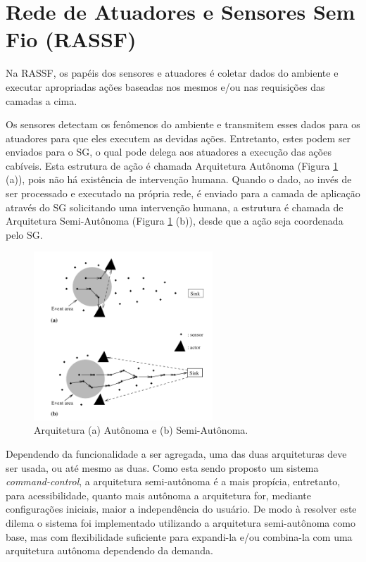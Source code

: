 \documentclass[12pt,a4paper,oneside]{report}
\begin{document}
\section{Rede de Atuadores e Sensores Sem Fio (RASSF)}

Na RASSF, os papéis dos sensores e atuadores é coletar dados do ambiente e executar apropriadas ações baseadas nos mesmos e/ou nas requisições das camadas a cima.

Os sensores detectam os fenômenos do ambiente e transmitem esses dados para os atuadores para que eles executem as devidas ações. Entretanto, estes podem ser enviados para o SG, o qual pode delega aos atuadores a execução das ações cabíveis. Esta estrutura de ação é chamada Arquitetura Autônoma (Figura \ref{fig:arquitetura-autonoma} (a)), pois não há existência de intervenção humana. Quando o dado, ao invés de ser processado e executado na própria rede, é enviado para a camada de aplicação através do SG solicitando uma intervenção humana, a estrutura é chamada de Arquitetura Semi-Autônoma (Figura \ref{fig:arquitetura-autonoma} (b)), desde que a ação seja coordenada pelo SG.

\begin{figure}[htbp]
   \centering
    \includegraphics[width=0.6\textwidth]{figuras/figura_2_6}
    \caption{Arquitetura (a) Autônoma e (b) Semi-Autônoma.}
    \label{fig:arquitetura-autonoma}
\end{figure}

Dependendo da funcionalidade a ser agregada, uma das duas arquiteturas deve ser usada, ou até mesmo as duas. Como esta sendo proposto um sistema \emph{command-control}, a arquitetura semi-autônoma é a mais propícia, entretanto, para acessibilidade, quanto mais autônoma a arquitetura for, mediante configurações iniciais, maior a independência do usuário. De modo à resolver este dilema o sistema foi implementado utilizando a arquitetura semi-autônoma como base, mas com flexibilidade suficiente para expandi-la e/ou combina-la com uma arquitetura autônoma dependendo da demanda.
\end{document}
